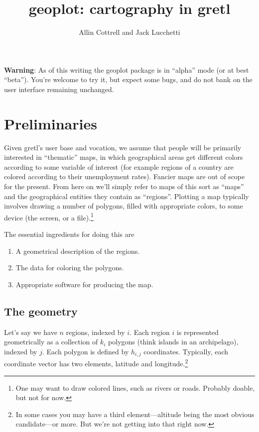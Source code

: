 \documentclass{article}
\title{geoplot: cartography in gretl}
\author{Allin Cottrell and Jack Lucchetti}
\begin{document}
\maketitle

\textbf{Warning}: As of this writing the \textsf{geoplot} package is
in ``alpha'' mode (or at best ``beta''). You're welcome to try it, but
expect some bugs, and do not bank on the user interface remaining
unchanged.

\section{Preliminaries}
\label{sec:prelim}

Given gretl's user base and vocation, we assume that people will be
primarily interested in ``thematic'' maps, in which geographical areas
get different colors according to some variable of interest (for
example regions of a country are colored according to their
unemployment rates). Fancier maps are out of scope for the
present. From here on we'll simply refer to maps of this sort as
``maps'' and the geographical entities they contain as
``regions''. Plotting a map typically involves drawing a number of
polygons, filled with appropriate colors, to some device (the screen,
or a file).\footnote{One may want to draw colored lines, such as
  rivers or roads. Probably doable, but not for now.}

The essential ingredients for doing this are
\begin{enumerate}
   \item A geometrical description of the regions.
   \item The data for coloring the polygons.
   \item Appropriate software for producing the map. 
\end{enumerate}
   
\subsection{The geometry}
\label{sec:geometry}

Let's say we have $n$ regions, indexed by $i$. Each region $i$ is
represented geometrically as a collection of $k_i$ polygons (think
islands in an archipelago), indexed by $j$. Each polygon is defined by
$h_{i,j}$ coordinates. Typically, each coordinate vector has two
elements, latitude and longitude.\footnote{In some cases you may have
  a third element---altitude being the most obvious candidate---or
  more.  But we're not getting into that right now.}
\end{document}
